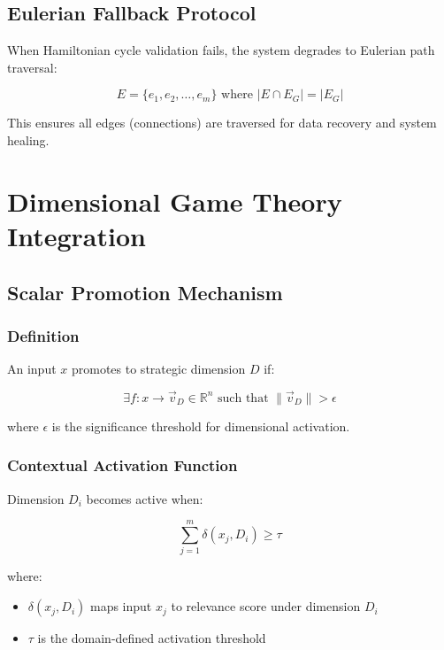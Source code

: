 \documentclass[12pt]{article}
\begin{document}
\subsection{Eulerian Fallback Protocol}

When Hamiltonian cycle validation fails, the system degrades to Eulerian path traversal:

\begin{equation}
E = \{e_1, e_2, \ldots, e_m\} \text{ where } |E \cap E_G| = |E_G|
\end{equation}

This ensures all edges (connections) are traversed for data recovery and system healing.

\section{Dimensional Game Theory Integration}

\subsection{Scalar Promotion Mechanism}

\subsubsection{Definition}

An input $x$ promotes to strategic dimension $D$ if:

\begin{equation}
\exists f : x \rightarrow \vec{v}_D \in \mathbb{R}^n \text{ such that } \|\vec{v}_D\| > \epsilon
\end{equation}

where $\epsilon$ is the significance threshold for dimensional activation.

\subsubsection{Contextual Activation Function}

Dimension $D_i$ becomes active when:

\begin{equation}
\sum_{j=1}^{m} \delta(x_j, D_i) \geq \tau
\end{equation}

where:
\begin{itemize}
    \item $\delta(x_j, D_i)$ maps input $x_j$ to relevance score under dimension $D_i$
    \item $\tau$ is the domain-defined activation threshold
\end{itemize}
\end{document}
